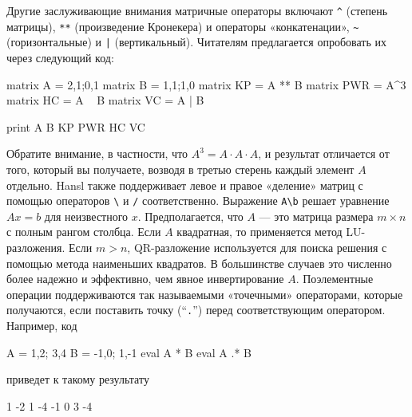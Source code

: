 Другие заслуживающие внимания матричные операторы включают \texttt{\^}
(степень матрицы), \texttt{**} (произведение Кронекера) и операторы
«конкатенации», \verb|~| (горизонтальные) и \texttt{|}
(вертикальный). Читателям предлагается опробовать их через следующий
код:
\begin{code}
matrix A = {2,1;0,1}
matrix B = {1,1;1,0}
matrix KP = A ** B
matrix PWR = A^3 
matrix HC = A ~ B
matrix VC = A | B

print A B KP PWR HC VC
\end{code}
Обратите внимание, в частности, что $A^3 = A \cdot A \cdot A$, и
результат отличается от того, который вы получаете, возводя в третью
стерень каждый элемент $A$ отдельно. Hansl также поддерживает левое и
правое «деление» матриц с помощью операторов \verb'\' и \verb'/'
соответственно. Выражение \verb|A\b| решает уравнение $Ax = b$ для
неизвестного $x$. Предполагается, что $A$ --- это матрица размера
$m \times n$ с полным рангом столбца. Если $A$ квадратная, то
применяется метод LU-разложения. Если $m > n$, QR-разложение
используется для поиска решения с помощью метода наименьших
квадратов. В большинстве случаев это численно более надежно и
эффективно, чем явное инвертирование $A$.  Поэлементные операции
поддерживаются так называемыми «точечными» операторами, которые
получаются, если поставить точку (``\texttt{.}'') перед
соответствующим оператором. Например, код
\begin{code}
A = {1,2; 3,4}
B = {-1,0; 1,-1}
eval A * B
eval A .* B
\end{code}
приведет к такому результату
\begin{code}
   1   -2 
   1   -4 
  -1    0 
   3   -4 
\end{code}

